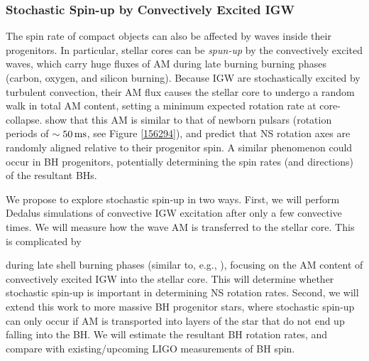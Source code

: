\subsubsection{Stochastic Spin-up by Convectively Excited IGW}

The spin rate of compact objects can also be affected by waves inside their progenitors. In particular, stellar cores can be {\it spun-up} by the convectively excited waves, which carry huge fluxes of AM during late burning burning phases (carbon, oxygen, and silicon burning). Because IGW are stochastically excited by turbulent convection, their AM flux causes the stellar core to undergo a random walk in total AM content, setting a minimum expected rotation rate at core-collapse. \cite{fullerwave:15} show that this AM is similar to that of newborn pulsars (rotation periods of $\sim 50 \, {\rm ms}$, see Figure \ref{156294}), and predict that NS rotation axes are randomly aligned relative to their progenitor spin. A similar phenomenon could occur in BH progenitors, potentially determining the spin rates (and directions) of the resultant BHs.

We propose to explore stochastic spin-up in two ways. First, we will perform Dedalus simulations of convective IGW excitation after only a few convective times. We will measure how the wave AM is transferred to the stellar core. This is complicated by 

during late shell burning phases (similar to, e.g., \cite{meakina:07,couch:15,cristini:16,}), focusing on the AM content of convectively excited IGW into the stellar core. This will determine whether stochastic spin-up is important in determining NS rotation rates. Second, we will extend this work to more massive BH progenitor stars, where stochastic spin-up can only occur if AM is transported into layers of the star that do not end up falling into the BH. We will estimate the resultant BH rotation rates, and compare with existing/upcoming LIGO measurements of BH spin.

